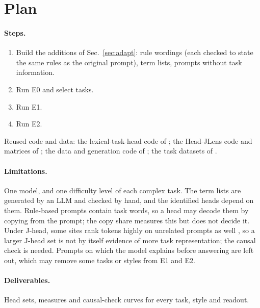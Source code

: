 \documentclass[11pt,a4paper]{article}
\begin{document}
\section{Plan}\label{sec:plan}
\paragraph{Steps.}
\begin{enumerate}
\item Build the additions of Sec.~\ref{sec:adapt}: rule wordings (each checked to state the same rules as the original prompt), term lists, prompts without task information.
\item Run E0 and select tasks.
\item Run E1.
\item Run E2.
\end{enumerate}
Reused code and data: the lexical-task-head code of \citet{yang2026shared}; the Head-JLens code and matrices of \citet{merlo2026headjlens}; the data and generation code of \citet{fu2026rules}; the task datasets of \citet{todd2024function}.

\paragraph{Limitations.} One model, and one difficulty level of each complex task. The term lists are generated by an LLM and checked by hand, and the identified heads depend on them. Rule-based prompts contain task words, so a head may decode them by copying from the prompt; the copy share measures this but does not decide it. Under J-head, some sites rank tokens highly on unrelated prompts as well \citep[Sec.~3.6]{merlo2026headjlens}, so a larger J-head set is not by itself evidence of more task representation; the causal check is needed. Prompts on which the model explains before answering are left out, which may remove some tasks or styles from E1 and E2.

\paragraph{Deliverables.} Head sets, measures and causal-check curves for every task, style and readout.




\appendix



\clearpage
\end{document}
